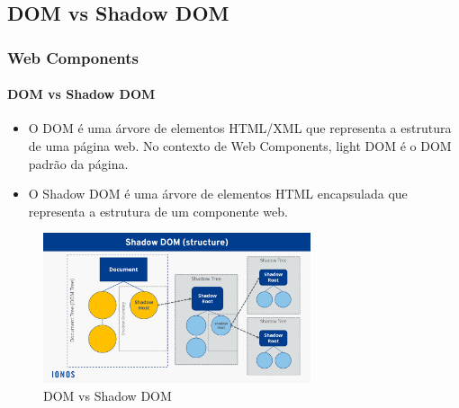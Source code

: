 \documentclass[
	9pt, %
	t, %
]{beamer}
\begin{document}
\subsection{DOM vs Shadow DOM}

\begin{frame}
	\frametitle{Web Components}
	\framesubtitle{DOM vs Shadow DOM}
	\begin{itemize}
		\item O DOM é uma árvore de elementos HTML/XML que representa a estrutura de uma
		      página web. No contexto de Web Components, light DOM é o DOM padrão da página.
		\item O Shadow DOM é uma árvore de elementos HTML encapsulada que representa a
		      estrutura de um componente web.
	\end{itemize}

	\begin{figure}
		\centering
		\includegraphics[width=0.7\textwidth]{dom_shadow_dom.png}
		\caption{DOM vs Shadow DOM}
	\end{figure}

\end{frame}
\end{document}
